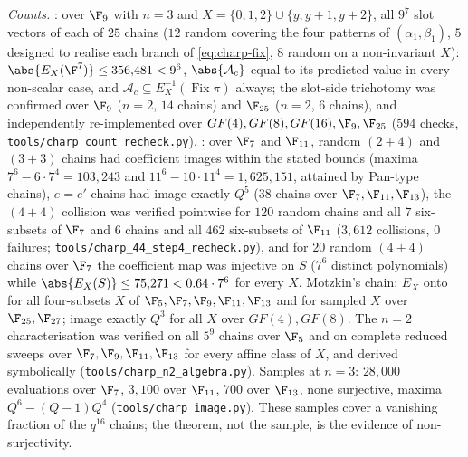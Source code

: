 \begin{remark}[Verification]
\emph{Counts.}  : over $\F_9$ with $n=3$ and
$X=\{0,1,2\}\cup\{y,y+1,y+2\}$, all $9^7$ slot vectors of each of $25$ chains ($12$ random
covering the four patterns of $(\alpha_1,\beta_1)$, $5$ designed to realise each branch of
\eqref{eq:charp-fix}, $8$ random on a non-invariant $X$): $\abs{E_X(\F^7)}\le356{,}481<9^6$,
$\abs{\mathcal A_c}$ equal to its predicted value in every non-scalar case, and
$\mathcal A_c\subseteq E_X^{-1}(\operatorname{Fix}\pi)$ always; the slot-side trichotomy
was confirmed over $\F_9$ ($n=2$, $14$ chains) and $\F_{25}$ ($n=2$, $6$ chains), and
independently re-implemented over $GF(4),GF(8),GF(16),\F_9,\F_{25}$ ($594$ checks,
\texttt{tools/charp\_count\_recheck.py}).  : over $\F_7$ and $\F_{11}$,
random $(2{+}4)$ and $(3{+}3)$ chains had coefficient images within the stated bounds
(maxima $7^6-6\cdot7^4=103{,}243$ and $11^6-10\cdot11^4=1{,}625{,}151$, attained by
Pan-type chains), $e=e'$ chains had image exactly $Q^5$ ($38$ chains over
$\F_7,\F_{11},\F_{13}$), the $(4{+}4)$ collision was verified pointwise for $120$ random
chains and all $7$ six-subsets of $\F_7$ and $6$ chains and all $462$ six-subsets of
$\F_{11}$ ($3{,}612$ collisions, $0$ failures; \texttt{tools/charp\_44\_step4\_recheck.py}),
and for $20$ random $(4{+}4)$ chains over $\F_7$ the coefficient map was injective on $S$
($7^6$ distinct polynomials) while $\abs{E_X(S)}\le75{,}271<0.64\cdot7^6$ for every $X$.
Motzkin's chain: $E_X$ onto for all four-subsets $X$ of $\F_5,\F_7,\F_9,\F_{11},\F_{13}$
and for sampled $X$ over $\F_{25},\F_{27}$; image exactly $Q^3$ for all $X$ over
$GF(4),GF(8)$.  The $n=2$ characterisation was verified on all $5^9$ chains over $\F_5$
and on complete reduced sweeps over $\F_7,\F_9,\F_{11},\F_{13}$ for every affine class of
$X$, and derived symbolically (\texttt{tools/charp\_n2\_algebra.py}).  Samples at $n=3$:
$28{,}000$ evaluations over $\F_7$, $3{,}100$ over $\F_{11}$, $700$ over $\F_{13}$, none
surjective, maxima $Q^6-(Q-1)Q^4$ (\texttt{tools/charp\_image.py}).  These samples cover a
vanishing fraction of the $q^{16}$ chains; the theorem, not the sample, is the evidence
of non-surjectivity.
\end{remark}
